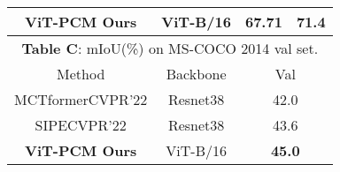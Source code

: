 \documentclass[runningheads]{styles/llncs}
\begin{document}
\begin{minipage}[t]{\textwidth}
\begin{minipage}[b]{0.499\textwidth}
{\begin{tabular}{|c | c | c | c | }
       \bf{ViT-PCM Ours} &ViT-B/16 &  \textbf{67.71} &  {\bf 71.4} \\
     \hline
\multicolumn{4}{c}{{\bf Table C}: mIoU(\%) on MS-COCO 2014 val  set.}\\
         \hline 
         \rowcolor[gray]{.85}
         Method &  Backbone &  \multicolumn{2}{c|}{Val}    \\ \hline
         \hline
         MCTformer\cite{xu2022multi}\tiny{\textsc{CVPR'22} } &  Resnet38 &  \multicolumn{2}{c|}{42.0} \\
          SIPE\cite{chen2022self}\tiny{\textsc{CVPR'22} } & Resnet38 &  \multicolumn{2}{c|}{43.6} \\
          {\bf ViT-PCM Ours}  & ViT-B/16 & \multicolumn{2}{c|}{\bf 45.0}\\
          \hline
\end{tabular}
    
}
\end{minipage}
\end{minipage}
\end{document}
